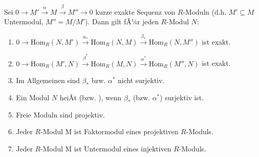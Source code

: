 \begin{PropDef}
  Sei $0 \to M' \overset{\alpha}{\to} M \overset{\beta}{\to} M'' \to 0$ kurze exakte Sequenz von $R$-Moduln (d.h.
  $M' \subseteq M$ Untermodul, $M'' = M/M'$). Dann gilt fÃ¼r jeden $R$-Modul $N$:
  \begin{enumerate}
    \item $0 \to \mbox{Hom}_R(N,M') \overset{\alpha_*}{\to} \mbox{Hom}_R(N,M) \overset{\beta_*}{\to}
          \mbox{Hom}_R(N,M'')$ ist exakt.
    \item $0 \to \mbox{Hom}_R(M',N) \overset{\beta^*}{\to} \mbox{Hom}_R(M,N) \overset{\alpha^*}{\to}
          \mbox{Hom}_R(M'',N)$ ist exakt.
    \item Im Allgemeinen sind $\beta_*$ bzw. $\alpha^*$ nicht surjektiv.
    \item Ein Modul $N$ heiÃt  (bzw.
          ), wenn $\beta_*$ (bzw.
          $\alpha^*$) surjektiv ist.
    \item Freie Moduln sind projektiv.
    \item Jeder $R$-Modul M ist Faktormodul eines projektiven $R$-Moduls.
    \item Jeder $R$-Modul M ist Untermodul eines injektiven $R$-Moduls.
  \end{enumerate}
\end{PropDef}


